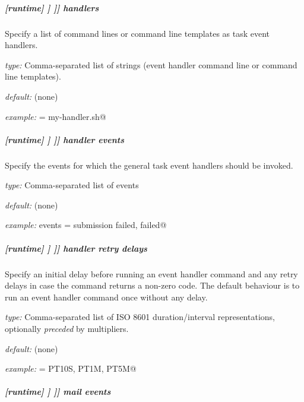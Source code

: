 \subparagraph[handlers]{[runtime] \textrightarrow [[\_\_NAME\_\_]] \textrightarrow [[[events]]] \textrightarrow handlers}

Specify a list of command lines or command line templates as task event handlers.

\begin{myitemize}
    \item {\em type:} Comma-separated list of strings (event handler command line or command line templates).
    \item {\em default:} (none)
    \item {\em example:} \lstinline@handlers = my-handler.sh@
\end{myitemize}

\subparagraph[handler events]{[runtime] \textrightarrow [[\_\_NAME\_\_]] \textrightarrow [[[events]]] \textrightarrow handler events}

Specify the events for which the general task event handlers should be invoked.

\begin{myitemize}
    \item {\em type:} Comma-separated list of events
    \item {\em default:} (none)
    \item {\em example:} \lstinline@handler events = submission failed, failed@
\end{myitemize}

\subparagraph[handler retry delays]{[runtime] \textrightarrow [[\_\_NAME\_\_]] \textrightarrow [[[events]]] \textrightarrow handler retry delays}
\label{runtime-events-handler-retry-delays}

Specify an initial delay before running an event handler command and any retry
delays in case the command returns a non-zero code. The default behaviour is to
run an event handler command once without any delay.

\begin{myitemize}
    \item {\em type:} Comma-separated list of ISO 8601 duration/interval representations, optionally {\em preceded} by multipliers.
    \item {\em default:} (none)
    \item {\em example:} \lstinline@handler = PT10S, PT1M, PT5M@
\end{myitemize}

\subparagraph[mail events]{[runtime] \textrightarrow [[\_\_NAME\_\_]] \textrightarrow [[[events]]] \textrightarrow mail events}

